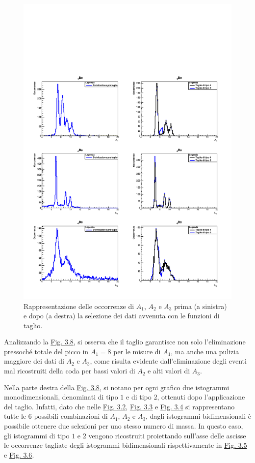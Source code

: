 \documentclass[12pt,a4paper,twoside]{report}
\begin{document}
	\begin{figure}[H]
		\centering
		\includegraphics[width=0.95\linewidth]{c_Berillum.pdf}
		\caption{Rappresentazione delle occorrenze di $A_1$, $A_2$ e $A_3$ prima (a sinistra) e dopo (a destra) la selezione dei dati avvenuta con le funzioni di taglio.}
		\label{fig:berillium}
	\end{figure}
	Analizzando la \hyperref[fig:berillium]{Fig. 3.8}, si osserva che il taglio garantisce non solo l'eliminazione pressoché totale del picco in $A_1=8$ per le misure di $A_1$, ma anche una pulizia maggiore dei dati di $A_2$ e $A_3$, come risulta evidente dall'eliminazione degli eventi mal ricostruiti della coda per bassi valori di $A_2$ e alti valori di $A_3$.
	
	Nella parte destra della \hyperref[fig:berillium]{Fig. 3.8}, si notano per ogni grafico due istogrammi monodimensionali, denominati di tipo $1$ e di tipo $2$, ottenuti dopo l'applicazione del taglio. Infatti, dato che nelle \hyperref[fig:a1]{Fig. 3.2}, \hyperref[fig:a2]{Fig. 3.3} e \hyperref[fig:a3]{Fig. 3.4} si rappresentano tutte le $6$ possibili combinazioni di $A_1$, $A_2$ e $A_3$, dagli istogrammi bidimensionali è possibile ottenere due selezioni per uno stesso numero di massa. In questo caso, gli istogrammi di tipo $1$ e $2$ vengono ricostruiti proiettando sull'asse delle ascisse le occorrenze tagliate degli istogrammi bidimensionali  rispettivamente in \hyperref[fig:a1_cut]{Fig. 3.5} e \hyperref[fig:a2_cut]{Fig. 3.6}.
	
\end{document}

